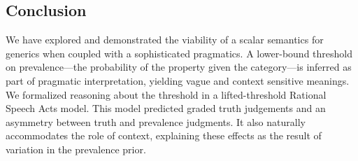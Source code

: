 \documentclass[10pt,letterpaper]{article}
\begin{document}



%
% 
\subsection{Conclusion} 


We have explored and demonstrated the viability of a scalar semantics for generics when coupled with a sophisticated pragmatics. 
A lower-bound threshold on prevalence---the probability of the property given the category---is inferred as part of pragmatic interpretation, yielding vague and context sensitive meanings. 
%
%
We formalized reasoning about the threshold in a lifted-threshold Rational Speech Acts model. This model predicted graded truth judgements and an asymmetry between truth and prevalence judgments. It also naturally accommodates the role of context, explaining these effects as the result of variation in the prevalence prior. 
\end{document}
